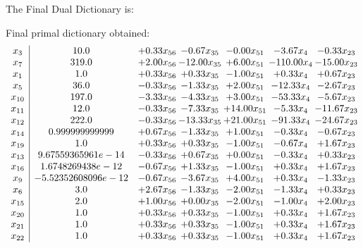 \documentclass[8pt]{article}
\begin{document}
The Final Dual Dictionary is: 

 Final primal dictionary obtained: 
\[\begin{array}{c| c c@{\hskip 2pt} c@{\hskip 2pt} c@{\hskip 2pt} c@{\hskip 2pt} c@{\hskip 2pt} }
 x_{3}   &  10.0 & +  0.33 x_{56} & -0.67 x_{35} & -0.00 x_{51} & -3.67 x_{4} & -0.33 x_{23}\\
 x_{7}   &  319.0 & +  2.00 x_{56} & -12.00 x_{35} & +  6.00 x_{51} & -110.00 x_{4} & -15.00 x_{23}\\
 x_{1}   &  1.0 & +  0.33 x_{56} & +  0.33 x_{35} & -1.00 x_{51} & +  0.33 x_{4} & +  0.67 x_{23}\\
 x_{5}   &  36.0 & -0.33 x_{56} & -1.33 x_{35} & +  2.00 x_{51} & -12.33 x_{4} & -2.67 x_{23}\\
 x_{10}   &  197.0 & -3.33 x_{56} & -4.33 x_{35} & +  3.00 x_{51} & -53.33 x_{4} & -5.67 x_{23}\\
 x_{11}   &  12.0 & -0.33 x_{56} & -7.33 x_{35} & + 14.00 x_{51} & -5.33 x_{4} & -11.67 x_{23}\\
 x_{12}   &  222.0 & -0.33 x_{56} & -13.33 x_{35} & + 21.00 x_{51} & -91.33 x_{4} & -24.67 x_{23}\\
 x_{14}   &  0.999999999999 & +  0.67 x_{56} & -1.33 x_{35} & +  1.00 x_{51} & -0.33 x_{4} & -0.67 x_{23}\\
 x_{19}   &  1.0 & +  0.33 x_{56} & +  0.33 x_{35} & -1.00 x_{51} & -0.67 x_{4} & +  1.67 x_{23}\\
 x_{13}   &  9.67559365961e-14 & -0.33 x_{56} & +  0.67 x_{35} & +  0.00 x_{51} & -0.33 x_{4} & +  0.33 x_{23}\\
 x_{16}   &  1.6748269438e-12 & -0.67 x_{56} & +  1.33 x_{35} & -1.00 x_{51} & +  0.33 x_{4} & +  1.67 x_{23}\\
 x_{9}   &  -5.52352608096e-12 & -0.67 x_{56} & -3.67 x_{35} & +  4.00 x_{51} & +  0.33 x_{4} & -1.33 x_{23}\\
 x_{6}   &  3.0 & +  2.67 x_{56} & -1.33 x_{35} & -2.00 x_{51} & -1.33 x_{4} & +  0.33 x_{23}\\
 x_{15}   &  2.0 & +  1.00 x_{56} & +  0.00 x_{35} & -2.00 x_{51} & -1.00 x_{4} & +  2.00 x_{23}\\
 x_{20}   &  1.0 & +  0.33 x_{56} & +  0.33 x_{35} & -1.00 x_{51} & +  0.33 x_{4} & +  1.67 x_{23}\\
 x_{21}   &  1.0 & +  0.33 x_{56} & +  0.33 x_{35} & -1.00 x_{51} & +  0.33 x_{4} & +  1.67 x_{23}\\
 x_{22}   &  1.0 & +  0.33 x_{56} & +  0.33 x_{35} & -1.00 x_{51} & +  0.33 x_{4} & +  1.67 x_{23}\\

\end{array}\]
\end{document}
